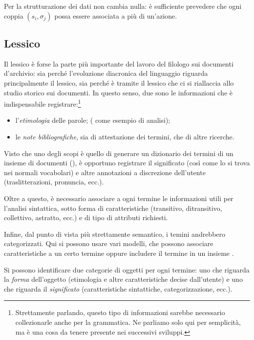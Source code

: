 \documentclass[twoside,stylearticle,11pt,filologia,it,article,bibsection]{spinoza}
\begin{document}
Per la strutturazione dei dati non cambia nulla: è sufficiente
prevedere che ogni coppia $(s_i,\sigma_j)$ possa essere associata a
più di un'azione.

\subsection{Lessico}


\afterpage{\clearpage}

Il lessico è forse la parte più importante del lavoro del filologo sui
documenti d'archivio: sia perché l'evoluzione diacronica del
linguaggio riguarda principalmente il lessico, sia perché è tramite il
lessico che ci si riallaccia allo studio storico sui documenti. In
questo senso, due sono le informazioni che è indispensabile
registrare:\footnote{Strettamente parlando, questo tipo di
  informazioni sarebbe necessario collezionarle anche per la
  grammatica. Ne parliamo solo qui per semplicità, ma è una cosa da
  tenere presente nei successivi sviluppi.}
\begin{itemize}
\item l'{\it etimologia} delle parole; (\vedi
   come esempio di analisi);
\item le {\it note bibliografiche}, sia di attestazione dei termini,
  che di altre ricerche.
\end{itemize}

Visto che uno degli scopi è quello di generare un dizionario dei
termini di un insieme di documenti (\vedi {}), è
opportuno registrare il significato (così come lo si trova nei normali
vocabolari) e altre annotazioni a discrezione dell'utente
(traslitterazioni, pronuncia, ecc.).

Oltre a questo, è necessario associare a ogni termine le informazioni
utili per l'analisi sintattica, sotto forma di caratteristiche
(transitivo, ditransitivo, collettivo, astratto, ecc.) e di tipo di
attributi richiesti. 

Infine, dal punto di vista più strettamente semantico, i temini
andrebbero categorizzati. Qui si possono usare vari modelli, che
possono associare caratteristiche a un certo termine oppure includere
il termine in un insieme . 

Si possono identificare due categorie di oggetti per ogni termine: uno
che riguarda la {\it forma} dell'oggetto (etimologia e altre
caratteristiche decise dall'utente) e uno che riguarda il {\it
  significato} (caratteristiche sintattiche, categorizzazione, ecc.).
\end{document}
